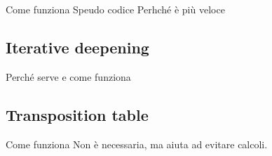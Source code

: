 \documentclass[a4paper]{article}
\begin{document}
%       

Come funziona
Speudo codice
Perhché è più veloce

\subsection{Iterative deepening}
Perché serve e come funziona

\subsection{Transposition table}
Come funziona
Non è necessaria, ma aiuta ad evitare calcoli.
\end{document}
